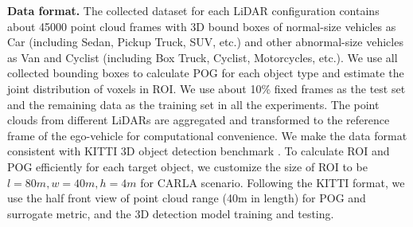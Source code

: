 \documentclass[10pt,twocolumn,letterpaper]{article}
\newcommand{\todo}[1]{\hl{[#1]}}
\begin{document}




\textbf{Data format.}
The collected dataset for each LiDAR configuration contains about 45000 point cloud frames with 3D bound boxes of normal-size vehicles as Car (including Sedan, Pickup Truck, SUV, etc.) and other abnormal-size vehicles as Van and Cyclist (including Box Truck, Cyclist, Motorcycles, etc.). We use all collected bounding boxes to calculate POG for each object type and estimate the joint distribution of voxels in ROI. We use about 10\% fixed frames as the test set and the remaining data as the training set in all the experiments. The point clouds from different LiDARs are aggregated and transformed to the reference frame of the ego-vehicle   for computational convenience. We make the data format consistent with KITTI 3D object detection benchmark
\cite{geiger2013vision}. To calculate ROI and POG efficiently for each target object, we customize the size of ROI to be $l=80m, w=40m, h=4m$ for CARLA scenario. Following the KITTI format, we use the half front view of point cloud range (40m in length)  for POG and surrogate metric, and the 3D detection model training and testing.
\end{document}

